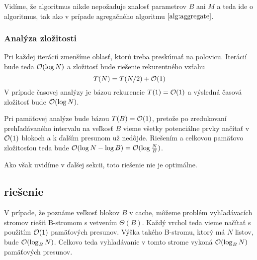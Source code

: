 Vidíme, že algoritmus nikde nepožaduje znalosť parametrov $B$ ani $M$ a teda ide o \obliv algoritmus, tak ako v prípade agregačného algoritmu $\ref{alg:aggregate}$.

\subsubsection{Analýza zložitosti}
Pri každej iterácií zmenšíme oblasť, ktorú treba preskúmať na polovicu. Iterácií bude teda $\mathcal{O}(\log N)$ a zložitosť bude riešenie rekurentného vzťahu
\[
T(N) = T(N/2) + \mathcal{O}(1)
\]
V prípade časovej analýzy je bázou rekurencie $T(1) = \mathcal{O}(1)$ a výsledná časová zložitosť bude $\mathcal{O}(\log N)$.

Pri pamäťovej analýze bude bázou $T(B) = \mathcal{O}(1)$, pretože po zredukovaní prehľadávaného intervalu na veľkosť $B$ vieme všetky potenciálne prvky načítať v $\mathcal{O}(1)$ blokoch a k ďalším presunom už nedôjde. Riešením a celkovou pamäťovo zložitosťou teda bude $\mathcal{O}(\log{N}-\log{B}) = \mathcal{O}(\log{\frac{N}{B}})$.

Ako však uvidíme v ďalšej sekcii, toto riešenie nie je optimálne.




\subsection{\Aware riešenie} \label{sec:static-aware}
V prípade, že poznáme veľkosť blokov $B$ v cache, môžeme problém vyhľadávacích stromov riešiť B-stromom s vetvením $\Theta(B)$. Každý vrchol teda vieme načítať s použitím $\mathcal{O}(1)$ pamäťových presunov. Výška takého B-stromu, ktorý má $N$ listov, bude $\mathcal{O}(\log_B{N})$. Celkovo teda vyhľadávanie v tomto strome vykoná $\mathcal{O}(\log_B{N})$ pamäťových presunov.

